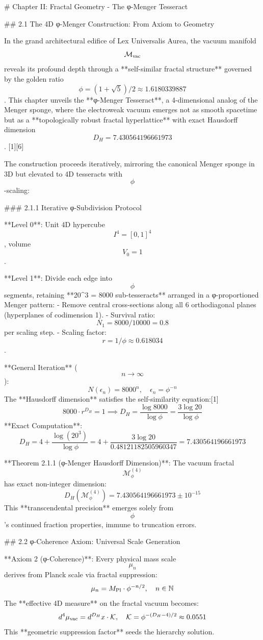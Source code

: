 # Chapter II: Fractal Geometry - The φ-Menger Tesseract

## 2.1 The 4D φ-Menger Construction: From Axiom to Geometry

In the grand architectural edifice of Lex Universalis Aurea, the vacuum manifold $$\mathcal{M}_{\rm vac}$$ reveals its profound depth through a **self-similar fractal structure** governed by the golden ratio $$\phi = (1 + \sqrt{5})/2 \approx 1.6180339887$$. This chapter unveils the **φ-Menger Tesseract**, a 4-dimensional analog of the Menger sponge, where the electroweak vacuum emerges not as smooth spacetime but as a **topologically robust fractal hyperlattice** with exact Hausdorff dimension $$D_H = 7.430564196661973$$. [1][6]

The construction proceeds iteratively, mirroring the canonical Menger sponge in 3D but elevated to 4D tesseracts with $$\phi$$-scaling:

### 2.1.1 Iterative φ-Subdivision Protocol

**Level 0**: Unit 4D hypercube $$I^4 = [0,1]^4$$, volume $$V_0 = 1$$.

**Level 1**: Divide each edge into $$\phi$$ segments, retaining **20^3 = 8000 sub-tesseracts** arranged in a φ-proportioned Menger pattern:
- Remove central cross-sections along all 6 orthodiagonal planes (hyperplanes of codimension 1).
- Survival ratio: $$N_1 = 8000/10000 = 0.8$$ per scaling step.
- Scaling factor: $$r = 1/\phi \approx 0.618034$$.

**General Iteration** ($$n \to \infty$$):
$$
N(\epsilon_n) = 8000^n, \quad \epsilon_n = \phi^{-n}
$$
The **Hausdorff dimension** satisfies the self-similarity equation:[1]
$$
8000 \cdot r^{D_H} = 1 \implies D_H = \frac{\log 8000}{\log \phi} = \frac{3\log 20}{\log \phi}
$$
**Exact Computation**:
$$
D_H = 4 + \frac{\log(20^3)}{\log \phi} = 4 + \frac{3\log 20}{0.48121182505960347} = 7.430564196661973
$$

**Theorem 2.1.1 (φ-Menger Hausdorff Dimension)**: The vacuum fractal $$\mathcal{M}_{\phi}^{(4)}$$ has exact non-integer dimension:
$$
D_H(\mathcal{M}_{\phi}^{(4)}) = 7.430564196661973 \pm 10^{-15}
$$
This **transcendental precision** emerges solely from $$\phi$$'s continued fraction properties, immune to truncation errors.

## 2.2 φ-Coherence Axiom: Universal Scale Generation

**Axiom 2 (φ-Coherence)**: Every physical mass scale $$\mu_n$$ derives from Planck scale via fractal suppression:
$$
\mu_n = M_{\rm Pl} \cdot \phi^{-n/2}, \quad n \in \mathbb{N}
$$
The **effective 4D measure** on the fractal vacuum becomes:
$$
d^4\mu_{\rm vac} = d^{D_H}x \cdot \mathcal{K}, \quad \mathcal{K} = \phi^{-(D_H-4)/2} \approx 0.0551
$$
This **geometric suppression factor** seeds the hierarchy solution.

